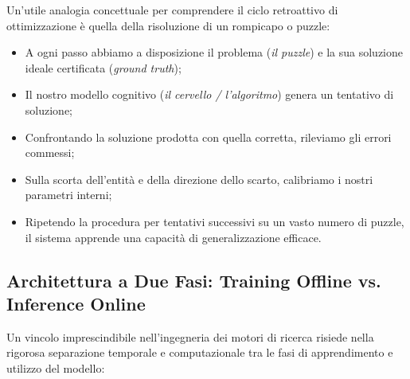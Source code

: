 Un'utile analogia concettuale per comprendere il ciclo retroattivo di ottimizzazione \`e quella della risoluzione di un rompicapo o puzzle:
\begin{itemize}
    \item A ogni passo abbiamo a disposizione il problema (\emph{il puzzle}) e la sua soluzione ideale certificata (\emph{ground truth});
    \item Il nostro modello cognitivo (\emph{il cervello / l'algoritmo}) genera un tentativo di soluzione;
    \item Confrontando la soluzione prodotta con quella corretta, rileviamo gli errori commessi;
    \item Sulla scorta dell'entit\`a e della direzione dello scarto, calibriamo i nostri parametri interni;
    \item Ripetendo la procedura per tentativi successivi su un vasto numero di puzzle, il sistema apprende una capacit\`a di generalizzazione efficace.
\end{itemize}

\FloatBarrier
\subsection{Architettura a Due Fasi: Training Offline vs. Inference Online}
\label{subsec:architettura-offline-online}

Un vincolo imprescindibile nell'ingegneria dei motori di ricerca risiede nella rigorosa separazione temporale e computazionale tra le fasi di apprendimento e utilizzo del modello:

